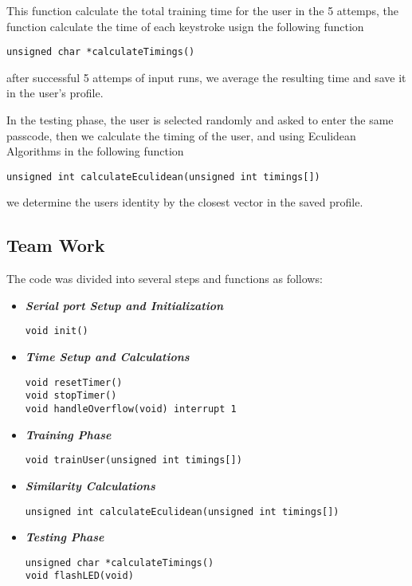 \documentclass[runningheads]{llncs}
\begin{document}
This function calculate the total training time for the user in the 5 attemps,
the function calculate the time of each keystroke usign the following function
\begin{lstlisting}[style=CStyle]
unsigned char *calculateTimings()
\end{lstlisting}
after successful 5 attemps of input runs, we average the resulting time and save it in the user's profile. \newline \newline 

In the testing phase, the user is selected randomly and asked to enter the same passcode,
then we calculate the timing of the user, and using Eculidean Algorithms in the following function
\begin{lstlisting}[style=CStyle]
unsigned int calculateEculidean(unsigned int timings[])
\end{lstlisting}
we determine the users identity by the closest vector in the saved profile. \newline


\subsection{Team Work}

The code was divided into several steps and functions as follows:
\begin{itemize}
  \setlength\itemsep{2em}

\item \textbf{\textit{Serial port Setup and Initialization}}
\begin{lstlisting}[style=CStyle]
void init()
\end{lstlisting}


\item \textbf{\textit{Time Setup and Calculations}}
\begin{lstlisting}[style=CStyle]
void resetTimer()
void stopTimer()
void handleOverflow(void) interrupt 1
\end{lstlisting}


\item \textbf{\textit{Training Phase}}
\begin{lstlisting}[style=CStyle]
void trainUser(unsigned int timings[])
\end{lstlisting}


\item \textbf{\textit{Similarity Calculations }}
\begin{lstlisting}[style=CStyle]
unsigned int calculateEculidean(unsigned int timings[])
\end{lstlisting}

\item \textbf{\textit{Testing Phase}}
\begin{lstlisting}[style=CStyle]
unsigned char *calculateTimings()
void flashLED(void)
\end{lstlisting}
\end{itemize}
\end{document}
